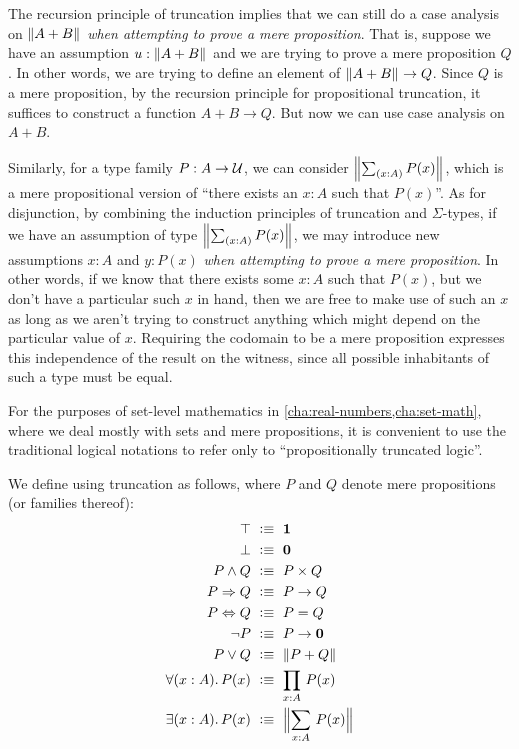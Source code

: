 The recursion principle of truncation implies that we can still do a case analysis on $\mathopen{}\left\Vert A+B\right\Vert_{}\mathclose{}$ \emph{when attempting to prove a mere proposition}.
That is, suppose we have an assumption $u:\mathopen{}\left\Vert A+B\right\Vert_{}\mathclose{}$ and we are trying to prove a mere proposition $Q$.
In other words, we are trying to define an element of $\mathopen{}\left\Vert A+B\right\Vert_{}\mathclose{} \to Q$.
Since $Q$ is a mere proposition, by the recursion principle for propositional truncation, it suffices to construct a function $A+B\to Q$.
But now we can use case analysis on $A+B$.

Similarly, for a type family $P:A\to\mathcal{U}$, we can consider $\brck{\sm{x:A} P(x)}$, which is a mere propositional version of ``there exists an $x:A$ such that $P(x)$''.
As for disjunction, by combining the induction principles of truncation and $\Sigma$-types, if we have an assumption of type $\brck{\sm{x:A} P(x)}$, we may introduce new assumptions $x:A$ and $y:P(x)$ \emph{when attempting to prove a mere proposition}.
In other words, if we know that there exists some $x:A$ such that $P(x)$, but we don't have a particular such $x$ in hand, then we are free to make use of such an $x$ as long as we aren't trying to construct anything which might depend on the particular value of $x$.
Requiring the codomain to be a mere proposition expresses this independence of the result on the witness, since all possible inhabitants of such a type must be equal.

For the purposes of set-level mathematics in \cref{cha:real-numbers,cha:set-math},
where we deal mostly with sets and mere propositions, it is convenient to use the
traditional logical notations to refer only to ``propositionally truncated logic''.

\begin{defn} \label{defn:logical-notation}
  We define 
  using truncation as follows, where $P$ and $Q$ denote mere propositions (or families thereof):
  {\allowdisplaybreaks
  \begin{align*}
    \top            &\ \defeq \ \unit \\
    \bot            &\ \defeq \ \emptyt \\
    P \land Q       &\ \defeq \ P \times Q \\
    P \Rightarrow Q &\ \defeq \ P \to Q \\
    P \Leftrightarrow Q &\ \defeq \ P = Q \\
    \neg P          &\ \defeq \ P \to \emptyt \\
    P \lor Q        &\ \defeq \ \brck{P + Q} \\
    \fall{x : A} P(x) &\ \defeq \ \prd{x : A} P(x) \\
    \exis{x : A} P(x) &\ \defeq \ \Brck{\sm{x : A} P(x)}
  \end{align*}}
\end{defn}

